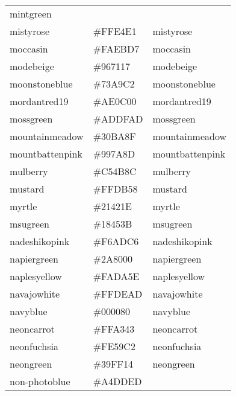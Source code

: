 \documentclass[
]{article}
\begin{document}
\begin{longtable}[]{@{}lll@{}}
\textcolor[rgb]{0.6,1.0,0.6}{mintgreen             }\tabularnewline
mistyrose & \colorbox[rgb]{1.0,0.89,0.88}{\#FFE4E1} &
\textcolor[rgb]{1.0,0.89,0.88}{mistyrose             }\tabularnewline
moccasin & \colorbox[rgb]{0.98,0.92,0.84}{\#FAEBD7} &
\textcolor[rgb]{0.98,0.92,0.84}{moccasin              }\tabularnewline
modebeige & \colorbox[rgb]{0.59,0.44,0.09}{\#967117} &
\textcolor[rgb]{0.59,0.44,0.09}{modebeige             }\tabularnewline
moonstoneblue & \colorbox[rgb]{0.45,0.66,0.76}{\#73A9C2} &
\textcolor[rgb]{0.45,0.66,0.76}{moonstoneblue         }\tabularnewline
mordantred19 & \colorbox[rgb]{0.68,0.05,0.0}{\#AE0C00} &
\textcolor[rgb]{0.68,0.05,0.0}{mordantred19          }\tabularnewline
mossgreen & \colorbox[rgb]{0.68,0.87,0.68}{\#ADDFAD} &
\textcolor[rgb]{0.68,0.87,0.68}{mossgreen             }\tabularnewline
mountainmeadow & \colorbox[rgb]{0.19,0.73,0.56}{\#30BA8F} &
\textcolor[rgb]{0.19,0.73,0.56}{mountainmeadow        }\tabularnewline
mountbattenpink & \colorbox[rgb]{0.6,0.48,0.55}{\#997A8D} &
\textcolor[rgb]{0.6,0.48,0.55}{mountbattenpink       }\tabularnewline
mulberry & \colorbox[rgb]{0.77,0.29,0.55}{\#C54B8C} &
\textcolor[rgb]{0.77,0.29,0.55}{mulberry              }\tabularnewline
mustard & \colorbox[rgb]{1.0,0.86,0.35}{\#FFDB58} &
\textcolor[rgb]{1.0,0.86,0.35}{mustard               }\tabularnewline
myrtle & \colorbox[rgb]{0.13,0.26,0.12}{\#21421E} &
\textcolor[rgb]{0.13,0.26,0.12}{myrtle                }\tabularnewline
msugreen & \colorbox[rgb]{0.09,0.27,0.23}{\#18453B} &
\textcolor[rgb]{0.09,0.27,0.23}{msugreen              }\tabularnewline
nadeshikopink & \colorbox[rgb]{0.96,0.68,0.78}{\#F6ADC6} &
\textcolor[rgb]{0.96,0.68,0.78}{nadeshikopink         }\tabularnewline
napiergreen & \colorbox[rgb]{0.16,0.5,0.0}{\#2A8000} &
\textcolor[rgb]{0.16,0.5,0.0}{napiergreen           }\tabularnewline
naplesyellow & \colorbox[rgb]{0.98,0.85,0.37}{\#FADA5E} &
\textcolor[rgb]{0.98,0.85,0.37}{naplesyellow          }\tabularnewline
navajowhite & \colorbox[rgb]{1.0,0.87,0.68}{\#FFDEAD} &
\textcolor[rgb]{1.0,0.87,0.68}{navajowhite           }\tabularnewline
navyblue & \colorbox[rgb]{0.0,0.0,0.5}{\#000080} &
\textcolor[rgb]{0.0,0.0,0.5}{navyblue              }\tabularnewline
neoncarrot & \colorbox[rgb]{1.0,0.64,0.26}{\#FFA343} &
\textcolor[rgb]{1.0,0.64,0.26}{neoncarrot            }\tabularnewline
neonfuchsia & \colorbox[rgb]{1.0,0.25,0.39}{\#FE59C2} &
\textcolor[rgb]{1.0,0.25,0.39}{neonfuchsia           }\tabularnewline
neongreen & \colorbox[rgb]{0.22,0.88,0.08}{\#39FF14} &
\textcolor[rgb]{0.22,0.88,0.08}{neongreen             }\tabularnewline
non-photoblue & \colorbox[rgb]{0.64,0.87,0.93}{\#A4DDED} &

\end{longtable}
\end{document}
